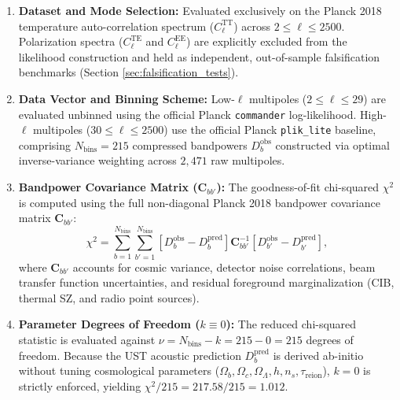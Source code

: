 \documentclass[11pt,a4paper]{article}
\begin{document}
	\begin{enumerate}
		\item \textbf{Dataset and Mode Selection:} Evaluated exclusively on the Planck 2018 temperature auto-correlation spectrum ($C_\ell^{\text{TT}}$) across $2 \le \ell \le 2500$. Polarization spectra ($C_\ell^{\text{TE}}$ and $C_\ell^{\text{EE}}$) are explicitly excluded from the likelihood construction and held as independent, out-of-sample falsification benchmarks (Section \ref{sec:falsification_tests}).
		
		\item \textbf{Data Vector and Binning Scheme:} Low-$\ell$ multipoles ($2 \le \ell \le 29$) are evaluated unbinned using the official Planck \texttt{commander} log-likelihood. High-$\ell$ multipoles ($30 \le \ell \le 2500$) use the official Planck \texttt{plik\_lite} baseline, comprising $N_{\text{bins}} = 215$ compressed bandpowers $D_b^{\text{obs}}$ constructed via optimal inverse-variance weighting across $2,471$ raw multipoles.
		
		\item \textbf{Bandpower Covariance Matrix ($\mathbf{C}_{bb'}$):} The goodness-of-fit chi-squared $\chi^2$ is computed using the full non-diagonal Planck 2018 bandpower covariance matrix $\mathbf{C}_{bb'}$:
		\begin{equation}
			\chi^2 = \sum_{b=1}^{N_{\text{bins}}} \sum_{b'=1}^{N_{\text{bins}}} \left[ D_b^{\text{obs}} - D_b^{\text{pred}} \right] \mathbf{C}_{bb'}^{-1} \left[ D_{b'}^{\text{obs}} - D_{b'}^{\text{pred}} \right],
			\label{eq:full_covariance_chi_square}
		\end{equation}
		where $\mathbf{C}_{bb'}$ accounts for cosmic variance, detector noise correlations, beam transfer function uncertainties, and residual foreground marginalization (CIB, thermal SZ, and radio point sources).
		
		\item \textbf{Parameter Degrees of Freedom ($k \equiv 0$):} The reduced chi-squared statistic is evaluated against $\nu = N_{\text{bins}} - k = 215 - 0 = 215$ degrees of freedom. Because the UST acoustic prediction $D_b^{\text{pred}}$ is derived ab-initio without tuning cosmological parameters ($\Omega_b, \Omega_c, \Omega_\Lambda, h, n_s, \tau_{\text{reion}}$), $k = 0$ is strictly enforced, yielding $\chi^2 / 215 = 217.58 / 215 = \mathbf{1.012}$.
	\end{enumerate}
	
\end{document}
